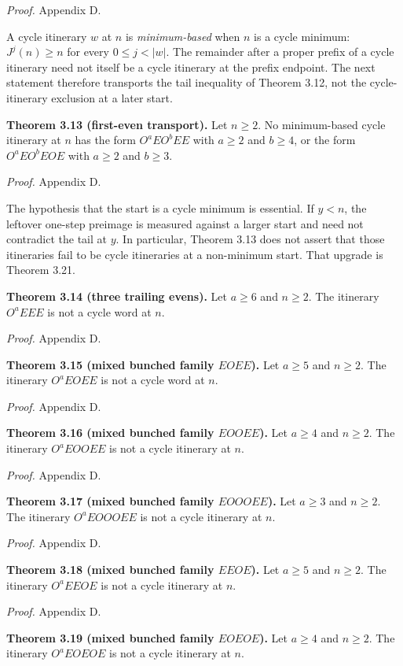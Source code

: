 \documentclass[12pt]{article}
\begin{document}
\emph{Proof.} Appendix D.

A cycle itinerary \(w\) at \(n\) is \emph{minimum-based} when \(n\) is a
cycle minimum: \(J^j(n)\ge n\) for every \(0\le j<|w|\). The remainder
after a proper prefix of a cycle itinerary need not itself be a cycle
itinerary at the prefix endpoint. The next statement therefore
transports the tail inequality of Theorem 3.12, not the cycle-itinerary
exclusion at a later start.

\textbf{Theorem 3.13 (first-even transport).} Let \(n\ge 2\). No
minimum-based cycle itinerary at \(n\) has the form \(O^aEO^bEE\) with
\(a\ge 2\) and \(b\ge 4\), or the form \(O^aEO^bEOE\) with \(a\ge 2\)
and \(b\ge 3\).

\emph{Proof.} Appendix D.

The hypothesis that the start is a cycle minimum is essential. If
\(y<n\), the leftover one-step preimage is measured against a larger
start and need not contradict the tail at \(y\). In particular, Theorem
3.13 does not assert that those itineraries fail to be cycle itineraries
at a non-minimum start. That upgrade is Theorem 3.21.

\textbf{Theorem 3.14 (three trailing evens).} Let \(a\ge 6\) and
\(n\ge 2\). The itinerary \(O^aEEE\) is not a cycle word at \(n\).

\emph{Proof.} Appendix D.

\textbf{Theorem 3.15 (mixed bunched family \(EOEE\)).} Let \(a\ge 5\)
and \(n\ge 2\). The itinerary \(O^aEOEE\) is not a cycle word at \(n\).

\emph{Proof.} Appendix D.

\textbf{Theorem 3.16 (mixed bunched family \(EOOEE\)).} Let \(a\ge 4\)
and \(n\ge 2\). The itinerary \(O^aEOOEE\) is not a cycle itinerary at
\(n\).

\emph{Proof.} Appendix D.

\textbf{Theorem 3.17 (mixed bunched family \(EOOOEE\)).} Let \(a\ge 3\)
and \(n\ge 2\). The itinerary \(O^aEOOOEE\) is not a cycle itinerary at
\(n\).

\emph{Proof.} Appendix D.

\textbf{Theorem 3.18 (mixed bunched family \(EEOE\)).} Let \(a\ge 5\)
and \(n\ge 2\). The itinerary \(O^aEEOE\) is not a cycle itinerary at
\(n\).

\emph{Proof.} Appendix D.

\textbf{Theorem 3.19 (mixed bunched family \(EOEOE\)).} Let \(a\ge 4\)
and \(n\ge 2\). The itinerary \(O^aEOEOE\) is not a cycle itinerary at
\(n\).
\end{document}
